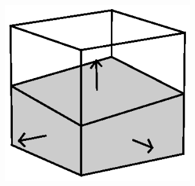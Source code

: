 \documentclass[12pt]{article}
\begin{document}






{}
{\clearpage}




  \noindent\includegraphics[width=19pc,angle=0]{./figures/cell_diagram}\\
\end{document}
